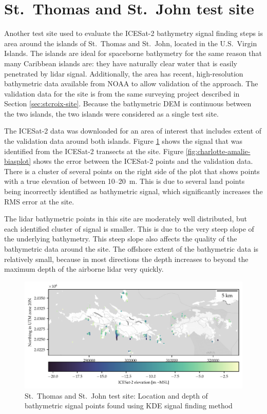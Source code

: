 \section{St.~Thomas and St.~John test site}
Another test site used to evaluate the ICESat-2 bathymetry signal finding steps is area around the islands of St.~Thomas and St.~John, located in the U.S.~Virgin Islands. The islands are ideal for spaceborne bathymetry for the same reason that many Caribbean islands are: they have naturally clear water that is easily penetrated by lidar signal. Additionally, the area has recent, high-resolution bathymetric data available from NOAA to allow validation of the approach. The validation data for the site is from the same surveying project described in Section \ref{sec:stcroix-site}. Because the bathymetric DEM is continuous between the two islands, the two islands were considered as a single test site.

The ICESat-2 data was downloaded for an area of interest that includes extent of the validation data around both islands. Figure \ref{fig:charlotte-amalie-photons} shows the signal that was identified from the ICESat-2 transects at the site. Figure \ref{fig:charlotte-amalie-biasplot} shows the error between the ICESat-2 points and the validation data. There is a cluster of several points on the right side of the plot that shows points with a true elevation of between 10--20~m. This is due to several land points being incorrectly identified as bathymetric signal, which significantly increases the RMS error at the site.

The lidar bathymetric points in this site are moderately well distributed, but each identified cluster of signal is smaller. This is due to the very steep slope of the underlying bathymetry. This steep slope also affects the quality of the bathymetric data around the site. The offshore extent of the bathymetric data is relatively small, because in most directions the depth increases to beyond the maximum depth of the airborne lidar very quickly.

\begin{figure}[!htb]
    \centering
    \includegraphics{figures/charlotteamalie_photon_map.pdf}
    \caption{St.~Thomas and St.~John test site: Location and depth of bathymetric signal points found using KDE signal finding method}
    \label{fig:charlotte-amalie-photons}
\end{figure}

